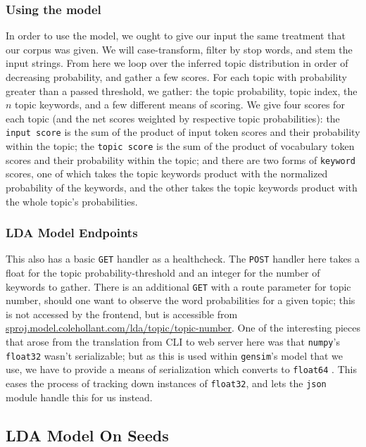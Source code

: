\documentclass[11pt, twoside, reqno]{book}
\begin{document}
\subsubsection{\textbf{Using the model}}

In order to use the model, we ought to give our input the same treatment that our corpus was given. We will case-transform, filter by stop words, and stem the input strings. From here we loop over the inferred topic distribution in order of decreasing probability, and gather a few scores. For each topic with probability greater than a passed threshold, we gather: the topic probability, topic index, the $n$ topic keywords, and a few different means of scoring. We give four scores for each topic (and the net scores weighted by respective topic probabilities): the \texttt{input score} is the sum of the product of input token scores and their probability within the topic; the \texttt{topic score} is the sum of the product of vocabulary token scores and their probability within the topic; and there are two forms of \texttt{keyword} scores, one of which takes the topic keywords product with the normalized probability of the keywords, and the other takes the topic keywords product with the whole topic's probabilities.

\subsubsection{\textbf{LDA Model Endpoints}}

This also has a basic \texttt{GET} handler as a healthcheck. The \texttt{POST} handler here takes a float for the topic probability-threshold and an integer for the number of keywords to gather. There is an additional \texttt{GET} with a route parameter for topic number, should one want to observe the word probabilities for a given topic; this is not accessed by the frontend, but is accessible from \href{https://sproj.model.colehollant.com/lda/topic/1}{sproj.model.colehollant.com/lda/topic/\<topic-number\>}. One of the interesting pieces that arose from the translation from CLI to web server here was that \texttt{numpy}'s \texttt{float32} wasn't serializable; but as this is used within \texttt{gensim}'s model that we use, we have to provide a means of serialization which converts to \texttt{float64} \cite{Howtoser37:online}. This eases the process of tracking down instances of \texttt{float32}, and lets the \texttt{json} module handle this for us instead.

\subsection{LDA Model On Seeds}
\end{document}

